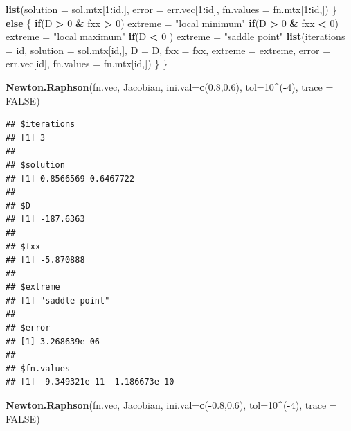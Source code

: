 \documentclass[
]{book}
\newenvironment{Shaded}{\begin{snugshade}}{\end{snugshade}}
\newcommand{\AttributeTok}[1]{\textcolor[rgb]{0.13,0.29,0.53}{#1}}
\newcommand{\ConstantTok}[1]{\textcolor[rgb]{0.56,0.35,0.01}{#1}}
\newcommand{\ControlFlowTok}[1]{\textcolor[rgb]{0.13,0.29,0.53}{\textbf{#1}}}
\newcommand{\DecValTok}[1]{\textcolor[rgb]{0.00,0.00,0.81}{#1}}
\newcommand{\FloatTok}[1]{\textcolor[rgb]{0.00,0.00,0.81}{#1}}
\newcommand{\FunctionTok}[1]{\textcolor[rgb]{0.13,0.29,0.53}{\textbf{#1}}}
\newcommand{\NormalTok}[1]{#1}
\newcommand{\OtherTok}[1]{\textcolor[rgb]{0.56,0.35,0.01}{#1}}
\newcommand{\SpecialCharTok}[1]{\textcolor[rgb]{0.81,0.36,0.00}{\textbf{#1}}}
\newcommand{\StringTok}[1]{\textcolor[rgb]{0.31,0.60,0.02}{#1}}
\begin{document}
\begin{Shaded}
\begin{Highlighting}[]
      \FunctionTok{list}\NormalTok{(}\AttributeTok{solution =}\NormalTok{ sol.mtx[}\DecValTok{1}\SpecialCharTok{:}\NormalTok{id,],  }\AttributeTok{error =}\NormalTok{ err.vec[}\DecValTok{1}\SpecialCharTok{:}\NormalTok{id], }\AttributeTok{fn.values =}\NormalTok{ fn.mtx[}\DecValTok{1}\SpecialCharTok{:}\NormalTok{id,])}
\NormalTok{  \} }\ControlFlowTok{else}\NormalTok{ \{}
   \ControlFlowTok{if}\NormalTok{(D }\SpecialCharTok{\textgreater{}} \DecValTok{0} \SpecialCharTok{\&}\NormalTok{ fxx }\SpecialCharTok{\textgreater{}} \DecValTok{0}\NormalTok{) extreme }\OtherTok{=} \StringTok{"local minimum"}
   \ControlFlowTok{if}\NormalTok{(D }\SpecialCharTok{\textgreater{}} \DecValTok{0} \SpecialCharTok{\&}\NormalTok{ fxx }\SpecialCharTok{\textless{}} \DecValTok{0}\NormalTok{) extreme }\OtherTok{=} \StringTok{"local maximum"}
   \ControlFlowTok{if}\NormalTok{(D }\SpecialCharTok{\textless{}} \DecValTok{0}\NormalTok{ ) extreme }\OtherTok{=} \StringTok{"saddle point"}
   \FunctionTok{list}\NormalTok{(}\AttributeTok{iterations =}\NormalTok{ id, }\AttributeTok{solution =}\NormalTok{ sol.mtx[id,], }\AttributeTok{D =}\NormalTok{ D, }\AttributeTok{fxx =}\NormalTok{ fxx, }\AttributeTok{extreme =}\NormalTok{ extreme, }\AttributeTok{error =}\NormalTok{ err.vec[id], }\AttributeTok{fn.values =}\NormalTok{ fn.mtx[id,])}
\NormalTok{  \}}
\NormalTok{ \}}
\end{Highlighting}
\end{Shaded}

\begin{Shaded}
\begin{Highlighting}[]
\FunctionTok{Newton.Raphson}\NormalTok{(fn.vec, Jacobian, }\AttributeTok{ini.val=}\FunctionTok{c}\NormalTok{(}\FloatTok{0.8}\NormalTok{,}\FloatTok{0.6}\NormalTok{), }\AttributeTok{tol=}\DecValTok{10}\SpecialCharTok{\^{}}\NormalTok{(}\SpecialCharTok{{-}}\DecValTok{4}\NormalTok{), }\AttributeTok{trace =} \ConstantTok{FALSE}\NormalTok{)}
\end{Highlighting}
\end{Shaded}

\begin{verbatim}
## $iterations
## [1] 3
## 
## $solution
## [1] 0.8566569 0.6467722
## 
## $D
## [1] -187.6363
## 
## $fxx
## [1] -5.870888
## 
## $extreme
## [1] "saddle point"
## 
## $error
## [1] 3.268639e-06
## 
## $fn.values
## [1]  9.349321e-11 -1.186673e-10
\end{verbatim}

\begin{Shaded}
\begin{Highlighting}[]
\FunctionTok{Newton.Raphson}\NormalTok{(fn.vec, Jacobian, }\AttributeTok{ini.val=}\FunctionTok{c}\NormalTok{(}\SpecialCharTok{{-}}\FloatTok{0.8}\NormalTok{,}\FloatTok{0.6}\NormalTok{), }\AttributeTok{tol=}\DecValTok{10}\SpecialCharTok{\^{}}\NormalTok{(}\SpecialCharTok{{-}}\DecValTok{4}\NormalTok{), }\AttributeTok{trace =} \ConstantTok{FALSE}\NormalTok{)}
\end{Highlighting}
\end{Shaded}
\end{document}
